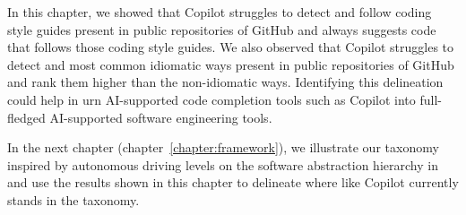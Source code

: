 In this chapter, we showed that Copilot struggles to detect and follow coding style guides present in public repositories of GitHub and always suggests code that follows those coding style guides. We also observed that Copilot struggles to detect and most common idiomatic ways present in public repositories of GitHub and rank them higher than the non-idiomatic ways. 
Identifying this delineation could help in urn AI-supported code completion tools such as Copilot into full-fledged AI-supported software engineering tools.

In the next chapter (chapter~\ref{chapter:framework}), we illustrate our taxonomy inspired by autonomous driving levels on the software abstraction hierarchy in \AISE{} and use the results shown in this chapter to delineate where \cct{} like Copilot currently stands in the taxonomy. 